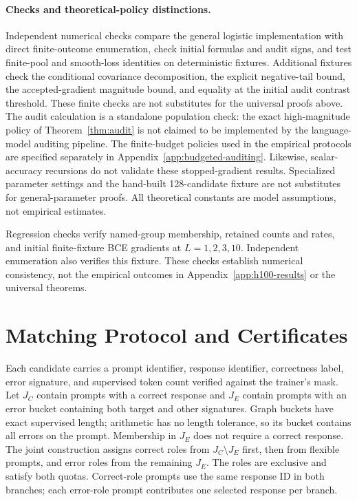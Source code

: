 \paragraph{Checks and theoretical-policy distinctions.}
Independent numerical checks compare the general logistic implementation
with direct finite-outcome enumeration,
check initial formulas and audit signs, and test finite-pool and smooth-loss
identities on deterministic fixtures. Additional fixtures check the
conditional covariance decomposition, the explicit negative-tail bound,
the accepted-gradient magnitude bound, and equality at the initial audit
contrast threshold. These finite checks are not substitutes for the
universal proofs above. The audit calculation is a
standalone population check: the exact
high-magnitude policy of Theorem~\ref{thm:audit} is not claimed to be
implemented by the language-model auditing pipeline. The finite-budget
policies used in the empirical protocols are specified separately in
Appendix~\ref{app:budgeted-auditing}. Likewise,
scalar-accuracy recursions do not validate these stopped-gradient results.
Specialized parameter settings and the hand-built 128-candidate fixture
are not substitutes for general-parameter proofs. All theoretical
constants are model assumptions, not empirical estimates.

Regression checks verify named-group membership, retained counts and rates,
and initial finite-fixture BCE gradients at $L=1,2,3,10$. Independent
enumeration also verifies this fixture. These checks establish numerical
consistency, not the empirical outcomes in Appendix~\ref{app:h100-results}
or the universal theorems.

\section{Matching Protocol and Certificates}
\label{app:matching}

Each candidate carries a prompt identifier, response identifier, correctness
label, error signature, and supervised token count verified against the
trainer's mask. Let $J_C$ contain prompts with a correct response and $J_E$
contain prompts with an error bucket containing both target and other
signatures. Graph buckets have exact supervised length; arithmetic has no
length tolerance, so its bucket contains all errors on the prompt.
Membership in $J_E$ does not require a correct response.
The joint construction assigns correct roles from $J_C\setminus J_E$ first,
then from flexible prompts, and error roles from the remaining $J_E$.
The roles are exclusive and satisfy both quotas. Correct-role prompts use
the same response ID in both branches;
each error-role prompt contributes one selected response per branch.

